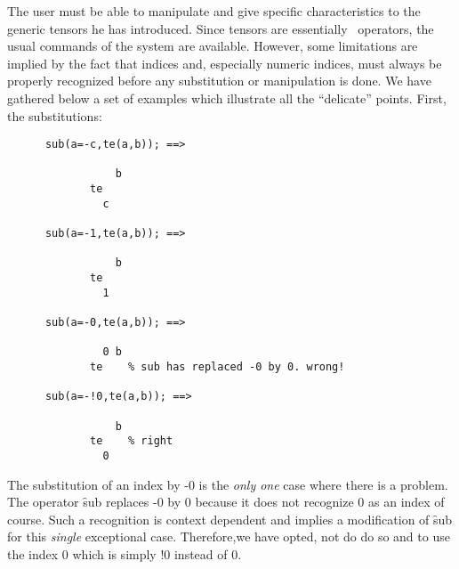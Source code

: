 
The user must be able to manipulate and give specific characteristics
to the generic tensors he has introduced.  Since tensors are essentially
\REDUCE\  operators, the usual commands of the system are
available.
However, some limitations are implied by the fact that indices and,
especially numeric indices, must always be properly recognized before
any substitution or manipulation is done. We have gathered below a set of
examples which illustrate all the ``delicate'' points.
First, the substitutions:
\begin{verbatim}
      sub(a=-c,te(a,b)); ==>

                 b
             te
               c

      sub(a=-1,te(a,b)); ==>

                 b
             te
               1

      sub(a=-0,te(a,b)); ==>

               0 b
             te    % sub has replaced -0 by 0. wrong!

      sub(a=-!0,te(a,b)); ==>

                 b
             te    % right
               0
\end{verbatim}
The substitution of an index  by -0 is the \emph{only one} case where
there is a problem. The operator \f{sub} replaces -0 by 0 because it does
not  recognize 0 as an index of course. Such a recognition is
context dependent and implies a modification of \f{sub}
for this \emph{single} exceptional case. Therefore,we have opted, not do do so
and to use the index 0 which is simply !0 instead of 0.

